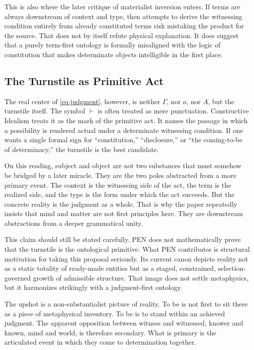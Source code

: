 \documentclass[11pt,a4paper]{article}
\theoremstyle{plain}
\theoremstyle{definition}
\theoremstyle{remark}
\begin{document}
This is also where the later critique of materialist inversion enters.
If terms are always downstream of context and type, then attempts to derive the witnessing condition entirely from already constituted terms risk mistaking the product for the source.
That does not by itself refute physical explanation.
It does suggest that a purely term-first ontology is formally misaligned with the logic of constitution that makes determinate objects intelligible in the first place.

\subsection{The Turnstile as Primitive Act}
\label{subsec:turnstile}

The real center of \eqref{eq:judgment}, however, is neither $\Gamma$, nor $a$, nor $A$, but the turnstile itself.
The symbol $\vdash$ is often treated as mere punctuation.
Constructive Idealism treats it as the mark of the primitive act.
It names the passage in which a possibility is rendered actual under a determinate witnessing condition.
If one wants a single formal sign for ``constitution,'' ``disclosure,'' or ``the coming-to-be of determinacy,'' the turnstile is the best candidate.

On this reading, subject and object are not two substances that must somehow be bridged by a later miracle.
They are the two poles abstracted from a more primary event.
The context is the witnessing side of the act, the term is the realized side, and the type is the form under which the act succeeds.
But the concrete reality is the judgment as a whole.
That is why the paper repeatedly insists that mind and matter are not first principles here.
They are downstream abstractions from a deeper grammatical unity.

This claim should still be stated carefully.
PEN does not mathematically prove that the turnstile is the ontological primitive.
What PEN contributes is structural motivation for taking this proposal seriously.
Its current canon depicts reality not as a static totality of ready-made entities but as a staged, constrained, selection-governed growth of admissible structure.
That image does not settle metaphysics, but it harmonizes strikingly with a judgment-first ontology.

The upshot is a non-substantialist picture of reality.
To be is not first to sit there as a piece of metaphysical inventory.
To be is to stand within an achieved judgment.
The apparent opposition between witness and witnessed, knower and known, mind and world, is therefore secondary.
What is primary is the articulated event in which they come to determination together.
\end{document}
